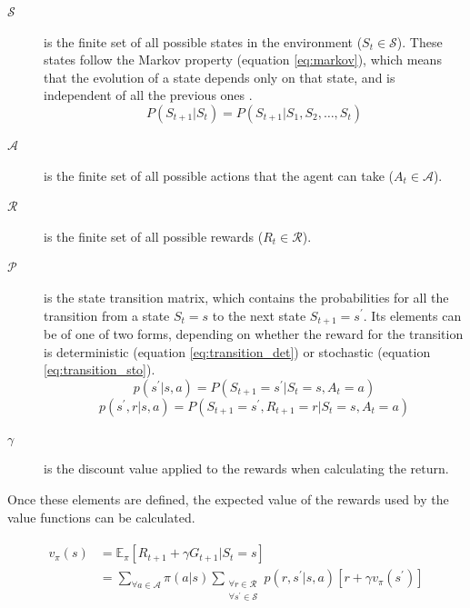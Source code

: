 \begin{description}
    \item[$\mathcal{S}$] is the finite set of all possible states in the environment ($S_t \in \mathcal{S}$). These states follow the Markov property (equation \ref{eq:markov}), which means that the evolution of a state depends only on that state, and is independent of all the previous ones \cite{Sutton:2014}.
    \begin{equation}
    \label{eq:markov}
        P(S_{t+1}|S_t) = P(S_{t+1}|S_1, S_2, \ldots, S_t)
    \end{equation}
    \item[$\mathcal{A}$] is the finite set of all possible actions that the agent can take ($A_t \in \mathcal{A}$).
    \item[$\mathcal{R}$] is the finite set of all possible rewards ($R_t \in \mathcal{R}$). 
    \item[$\mathcal{P}$] is the state transition matrix, which contains the probabilities for all the transition from a state $S_t=s$ to the next state $S_{t+1}=s^\prime$. Its elements can be of one of two forms, depending on whether the reward for the transition is deterministic (equation \ref{eq:transition_det}) or stochastic (equation \ref{eq:transition_sto}).
    \begin{equation}
    \label{eq:transition_det}
        p(s^\prime|s, a) = P(S_{t+1} = s^\prime|S_t = s, A_t = a)
    \end{equation}
    \begin{equation}
    \label{eq:transition_sto}
        p(s^\prime, r|s, a) = P(S_{t+1} = s^\prime, R_{t+1} = r|S_t = s, A_t = a)
    \end{equation}
    \item[$\gamma$] is the discount value applied to the rewards when calculating the return.
\end{description}

Once these elements are defined, the expected value of the rewards used by the value functions can be calculated.

\begin{align}
\begin{split}
    \label{eq:bellman_state}
    v_\pi(s) &= \mathbb{E}_\pi[R_{t+1} + \gamma G_{t+1}|S_t = s] \\
    &= \sum_{\forall a \in \mathcal{A}}{\pi(a|s)} \sum_{\substack{\forall r \in \mathcal{R} \\ \forall s^\prime \in \mathcal{S}}}{p(r,s^\prime|s,a)[r + \gamma v_\pi(s^\prime)]}
\end{split}
\end{align}

